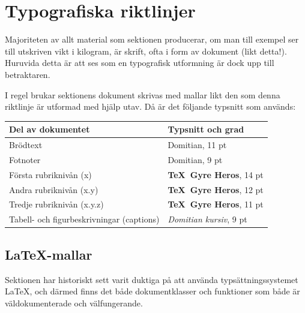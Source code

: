 \documentclass[]{dsekprotokoll}
\begin{document}

\section{Typografiska riktlinjer}
Majoriteten av allt material som sektionen producerar, om man till
exempel ser till utskriven vikt i kilogram, är skrift, ofta i form av
dokument (likt detta!). Huruvida detta är att ses som en typografisk
utformning är dock upp till betraktaren.

I regel brukar sektionens dokument skrivas med mallar likt den som
denna riktlinje är utformad med hjälp utav. Då är det följande
typsnitt som används:

\begin{table}[!hbp]
  \centering
  \begin{tabular}{ll}
    \toprule
    \textbf{Del av dokumentet}                & \textbf{Typsnitt och
    grad}                 \\
    \midrule
    Brödtext                                  & Domitian, 11 pt
    \\
    Fotnoter                                  & Domitian, 9 pt
    \\
    Första rubriknivån (x)                    & {\sffamily \bfseries
    \TeX\ Gyre Heros}, 14 pt \\
    Andra rubriknivån (x.y)                   & {\sffamily \bfseries
    \TeX\ Gyre Heros}, 12 pt \\
    Tredje rubriknivån (x.y.z)                & {\sffamily \bfseries
    \TeX\ Gyre Heros}, 11 pt \\
    Tabell- och figurbeskrivningar (captions) & \textit{Domitian
    kursiv}, 9 pt             \\

    \bottomrule
  \end{tabular}
  \label{tab:my_label}
\end{table}

\subsection{\LaTeX-mallar}
Sektionen har historiskt sett varit duktiga på att använda
typsättningssystemet \LaTeX, och därmed finns det både
dokumentklasser och funktioner som både är väldokumenterade och välfungerande.
\end{document}
